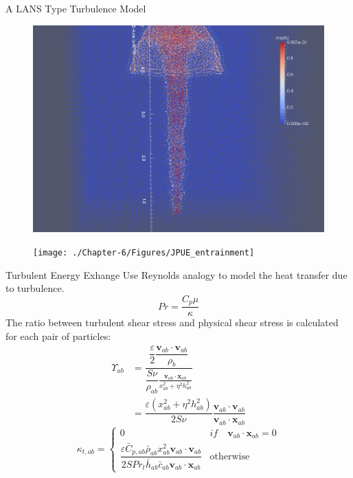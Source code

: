\documentclass{beamer}
\begin{document}
\begin{frame}{A LANS Type Turbulence Model}
\begin{minipage}{0.34 \textwidth}
\begin{figure}
\includegraphics[width=0.80 \textwidth]{./PPT/No_turb}
\end{figure}
%
\begin{figure}
\texttt{[image: ./Chapter-6/Figures/JPUE\_entrainment]}
\end{figure}
\end{minipage}
\end{frame}

\begin{frame}{Turbulent Energy Exhange}
Use Reynolds analogy to model the heat transfer due to turbulence.
\begin{equation}
Pr=\dfrac{C_p \mu}{\kappa}
\end{equation}
The ratio between turbulent shear stress and physical shear stress is calculated for each pair of particles:
\begin{equation}
\begin{split}
\Upsilon_{ab} &= \dfrac{\dfrac{\varepsilon}{2} \dfrac{\textbf{v}_{ab} \cdot \textbf{v}_{ab}}{\rho_b}}{\dfrac{S \nu}{\rho_{ab}} \frac{\textbf{v}_{ab} \cdot \textbf{x}_{ab}}{x_{ab}^2 + \eta^2 h_{ab}^2}} \\
 & = \dfrac{\varepsilon \left(x_{ab}^2 + \eta^2 h_{ab}^2\right)}{2 S \nu} \dfrac{\textbf{v}_{ab} \cdot \textbf{v}_{ab}}{\textbf{v}_{ab} \cdot \textbf{x}_{ab}}
\end{split}
\end{equation}
\begin{equation}
\kappa_{t,ab}= 
\begin{cases} 
      0 & if \quad \textbf{v}_{ab} \cdot \textbf{x}_{ab} = 0 \\
      \dfrac{\varepsilon \bar{C}_{p,ab} \bar{\rho}_{ab} x_{ab}^2 \textbf{v}_{ab} \cdot \textbf{v}_{ab}}{2 S Pr_t \bar{h}_{ab} \bar{c}_{ab} \textbf{v}_{ab} \cdot \textbf{x}_{ab} } & \text{otherwise}
\end{cases}
\label{eq:SPH-LANS-heat-conductivity}
\end{equation}
\end{frame}
\end{document}
